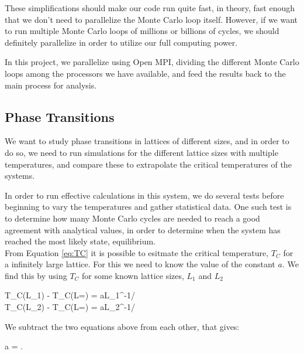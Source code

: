 \documentclass{article}
\begin{document}
		These simplifications should make our code run quite fast, in theory, fast enough that we don't need to parallelize the Monte Carlo loop itself. However, if we want to run multiple Monte Carlo loops of millions or billions of cycles, we should definitely parallelize in order to utilize our full computing power.

		In this project, we parallelize using Open MPI, dividing the different Monte Carlo loops among the processors we have available, and feed the results back to the main process for analysis.

	\subsection{Phase Transitions}
		We want to study phase transitions in lattices of different sizes, and in order to do so, we need to run simulations for the different lattice sizes with multiple temperatures, and compare these to extrapolate the critical temperatures of the systems.

		In order to run effective calculations in this system, we do several tests before beginning to vary the temperatures and gather statistical data. One such test is to determine how many Monte Carlo cycles are needed to reach a good agreement with analytical values, in order to determine when the system has reached the most likely state, equilibrium.\\

		From Equation \ref{eq:TC} it is possible to esitmate the critical temperature, $T_C$ for a infinitely large lattice. For this we need to know the value of the constant $a$. We find this by using $T_C$ for some known lattice sizes, $L_1$ and $L_2$

		\begin{flalign*}
			T_C(L_1) - T_C(L=\infty) = aL_1^{-1/\nu}\\
			T_C(L_2) - T_C(L=\infty) = aL_2^{-1/\nu}
		\end{flalign*}

		We subtract the two equations above from each other, that gives:

		\begin{flalign}
			a = .
			\label{eq:a}
		\end{flalign}
\end{document}

